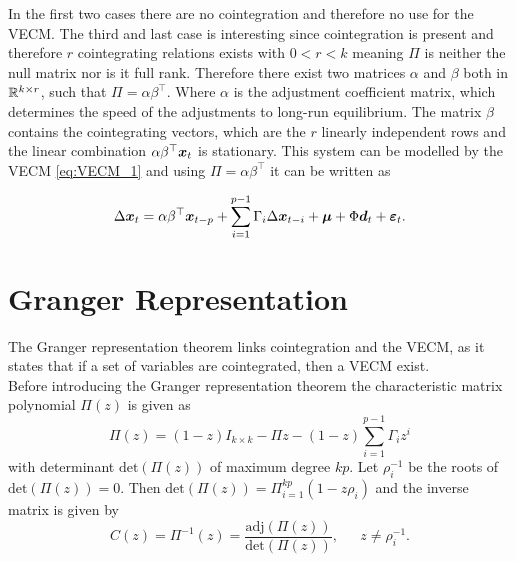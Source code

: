 In the first two cases there are no cointegration and therefore no use for the VECM. The third and last case is interesting since cointegration is present and therefore $r$ cointegrating relations exists with $0<r<k$ meaning $\Pi$ is neither the null matrix nor is it full rank. Therefore there exist two matrices $\alpha$ and $\beta$ both in $\mathbb{R}^{k\times r}$, such that $\Pi=\alpha \beta^\top$. Where $\alpha$ is the adjustment coefficient matrix, which determines the speed of the adjustments to long-run equilibrium. The matrix $\beta$ contains the cointegrating vectors, which are the $r$ linearly independent rows and the linear combination $\alpha\beta^\top \boldsymbol{x}_t$ is stationary. This system can be modelled by the VECM \eqref{eq:VECM_1} and using $\Pi=\alpha\beta^\top$ it can be written as

\begin{equation}
\Delta \boldsymbol{x}_t = \alpha\beta^\top \boldsymbol{x}_{t-p} + \sum_{i=1}^{p-1}\Gamma_i\Delta \boldsymbol{x}_{t-i} + \boldsymbol{\mu} + \Phi \boldsymbol{d}_t + \boldsymbol{\varepsilon}_t.
    \label{eq:VECM_2}
\end{equation}
\section{Granger Representation}

\noindent The Granger representation theorem links cointegration and the VECM, as it states that if a set of variables are cointegrated, then a VECM exist.\\
%
\noindent 
Before introducing the Granger representation theorem the characteristic matrix polynomial $\Pi(z)$ is given as
\begin{equation*}
    \Pi(z)=(1-z)I_{k\times k}-\Pi z-(1-z)\sum_{i=1}^{p-1}\Gamma_i z^i
\end{equation*}
\noindent with determinant $\text{det}(\Pi(z)) $ of maximum degree $kp$. Let $\rho^{-1}_i$ be the roots of $\text{det}(\Pi(z)) = 0$. Then $\text{det}(\Pi(z)) = \Pi^{kp}_{i=1}(1-z \rho_i)$ and the inverse matrix is given by 
\begin{equation*}
    C(z)=\Pi^{-1}(z)=\frac{\text{adj}(\Pi(z))}{\text{det}(\Pi(z))}, \phantom{asd} z\neq \rho^{-1}_i.
\end{equation*}

